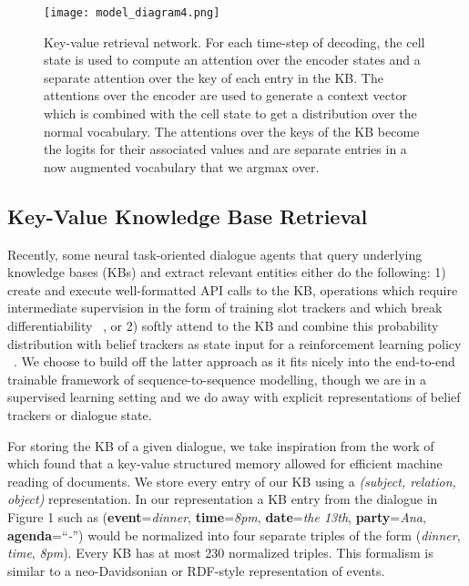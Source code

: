 \documentclass[11pt,a4paper]{article}
\begin{document}
  \begin{figure*}[ht]
    \texttt{[image: model\_diagram4.png]}
    \caption{Key-value retrieval network. For each time-step of decoding, the cell state is used to compute an attention over the encoder states and a separate attention over the key of each entry in the KB. The attentions over the encoder are used to generate a context vector which is combined with the cell state to get a distribution over the normal vocabulary. The attentions over the keys of the KB become the logits for their associated values and are separate entries in a now augmented vocabulary that we argmax over.}
  \end{figure*}


\subsection{Key-Value Knowledge Base Retrieval}

  Recently, some neural task-oriented dialogue agents that query underlying knowledge bases (KBs) and extract relevant entities either do the following: 1) create and execute well-formatted API calls to the KB, operations which require intermediate supervision in the form of training slot trackers and which break differentiability ~\cite{Wen:16}, or 2) softly attend to the KB and combine this probability distribution with belief trackers as state input for a reinforcement learning policy ~\cite{Dhingra:16}. We choose to build off the latter approach as it fits nicely into the end-to-end trainable framework of sequence-to-sequence modelling, though we are in a supervised learning setting and we do away with explicit representations of belief trackers or dialogue state. 

  For storing the KB of a given dialogue, we take inspiration from the work of ~\cite{miller-EtAl:2016:EMNLP2016} which found that a key-value structured memory allowed for efficient machine reading of documents. We store every entry of our KB using a \emph{(subject, relation, object)} representation. In our representation a KB entry from the dialogue in Figure 1 such as (\textbf{event}=\emph{dinner}, \textbf{time}=\emph{8pm}, \textbf{date}=\emph{the 13th}, \textbf{party}=\emph{Ana}, \textbf{agenda}=``\emph{-}'') would be normalized into four separate triples of the form (\emph{dinner}, \emph{time}, \emph{8pm}). Every KB has at most 230 normalized triples. This formalism is similar to a neo-Davidsonian or RDF-style representation of events.
\end{document}
